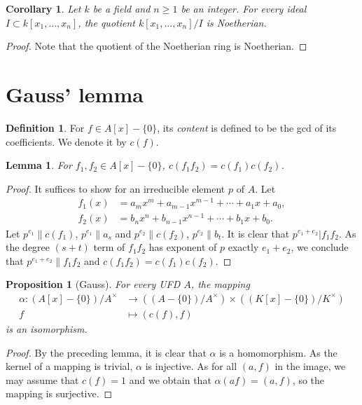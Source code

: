 \documentclass[12pt]{report}
\theoremstyle{plain}
\newtheorem{corollary}[theorem]{Corollary}
\newtheorem{lemma}[theorem]{Lemma}
\newtheorem{proposition}[theorem]{Proposition}
\theoremstyle{remark}
\theoremstyle{definition}
\newtheorem{definition}[theorem]{Definition}
\begin{document}
\begin{corollary}
    Let $k$ be a field and $n\ge 1$ be an integer. For every ideal $I\subset k[x_1,\dots,x_n]$, the quotient $k[x_1,\dots,x_n]/I$ is Noetherian.
\end{corollary}
\begin{proof}
    Note that the quotient of the Noetherian ring is Noetherian.
\end{proof}


\clearpage
\section{Gauss' lemma}

\begin{definition}
    For $f\in A[x]-\{0\}$, its \emph{content} is defined to be the gcd of its coefficients. We denote it by $c(f)$.
\end{definition}

\begin{lemma}
    For $f_1,f_2\in A[x]-\{0\}$, $c(f_1f_2)=c(f_1)c(f_2)$.
\end{lemma}
\begin{proof}
    It suffices to show for an irreducible element $p$ of $A$. Let
    \begin{align*}
        f_1(x) &= a_mx^m + a_{m-1}x^{m-1}+\cdots+a_1x+a_0, \\
        f_2(x) &= b_nx^n + b_{n-1}x^{n-1}+\cdots+b_1x+b_0.
    \end{align*}
    Let $p^{e_1}\|c(f_1)$, $p^{e_1}\| a_s$ and $p^{e_2}\|c(f_2)$, $p^{e_2}\| b_t$. It is clear that $p^{e_1+e_2}|f_1f_2$. As the degree $(s+t)$ term of $f_1f_2$ has exponent of $p$ exactly $e_1+e_2$, we conclude that $p^{e_1+e_2}\|f_1f_2$ and $c(f_1f_2)=c(f_1)c(f_2)$.
\end{proof}

\begin{proposition}[Gauss]
    For every UFD $A$, the mapping
    \begin{align*}
        \alpha:(A[x]-\{0\})/A^\times &\rightarrow ((A-\{0\})/A^\times)\times ((K[x]-\{0\})/K^\times) \\
        f &\mapsto (c(f),f)
    \end{align*}
    is an isomorphism.
\end{proposition}
\begin{proof}
    By the preceding lemma, it is clear that $\alpha$ is a homomorphism. As the kernel of a mapping is trivial, $\alpha$ is injective. As for all $(a,f)$ in the image, we may assume that $c(f)=1$ and we obtain that $\alpha(af)=(a,f)$, so the mapping is surjective.
\end{proof}
\end{document}

